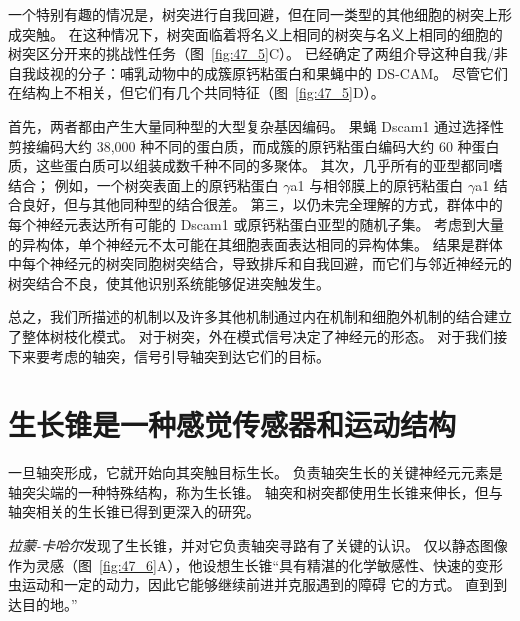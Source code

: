 一个特别有趣的情况是，树突进行自我回避，但在同一类型的其他细胞的树突上形成突触。
在这种情况下，树突面临着将名义上相同的树突与名义上相同的细胞的树突区分开来的挑战性任务（图~\ref{fig:47_5}C）。
已经确定了两组介导这种自我/非自我歧视的分子：哺乳动物中的成簇原钙粘蛋白和果蝇中的 DS-CAM。
尽管它们在结构上不相关，但它们有几个共同特征（图~\ref{fig:47_5}D）。


首先，两者都由产生大量同种型的大型复杂基因编码。
果蝇 Dscam1 通过选择性剪接编码大约 38,000 种不同的蛋白质，而成簇的原钙粘蛋白编码大约 60 种蛋白质，这些蛋白质可以组装成数千种不同的多聚体。
其次，几乎所有的亚型都同嗜结合；
例如，一个树突表面上的原钙粘蛋白 $\gamma$a1 与相邻膜上的原钙粘蛋白 $\gamma$a1 结合良好，但与其他同种型的结合很差。
第三，以仍未完全理解的方式，群体中的每个神经元表达所有可能的 Dscam1 或原钙粘蛋白亚型的随机子集。
考虑到大量的异构体，单个神经元不太可能在其细胞表面表达相同的异构体集。
结果是群体中每个神经元的树突同胞树突结合，导致排斥和自我回避，而它们与邻近神经元的树突结合不良，使其他识别系统能够促进突触发生。


总之，我们所描述的机制以及许多其他机制通过内在机制和细胞外机制的结合建立了整体树枝化模式。
对于树突，外在模式信号决定了神经元的形态。
对于我们接下来要考虑的轴突，信号引导轴突到达它们的目标。



\section{生长锥是一种感觉传感器和运动结构}

一旦轴突形成，它就开始向其突触目标生长。
负责轴突生长的关键神经元元素是轴突尖端的一种特殊结构，称为生长锥。
轴突和树突都使用生长锥来伸长，但与轴突相关的生长锥已得到更深入的研究。


\textit{拉蒙-卡哈尔}发现了生长锥，并对它负责轴突寻路有了关键的认识。
仅以静态图像作为灵感（图~\ref{fig:47_6}A），他设想生长锥“具有精湛的化学敏感性、快速的变形虫运动和一定的动力，因此它能够继续前进并克服遇到的障碍 它的方式。 
直到到达目的地。”


